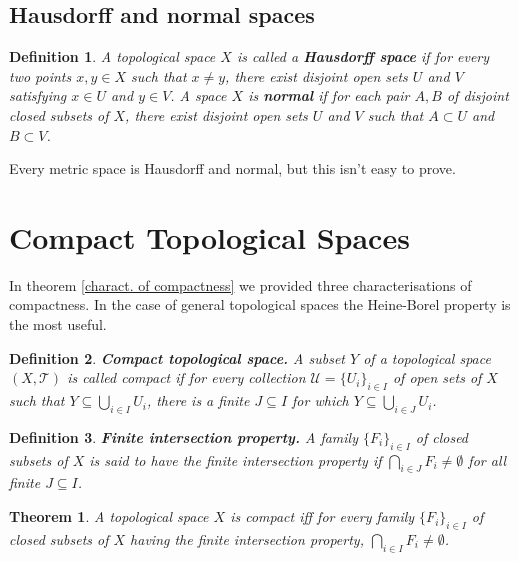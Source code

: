\documentclass[two column]{article}
\newtheorem{theorem}{Theorem}[subsection]
\newtheorem{definition}{Definition}[subsection]
\begin{document}
\subsection{Hausdorff and normal spaces}

\begin{definition}
A topological space $X$ is called a {\bf Hausdorff space} if for every two points $x,y \in X$ such that $x \neq y$, there exist disjoint open sets $U$ and $V$ satisfying $x \in U$ and $y \in V$. A space $X$ is {\bf normal} if for each pair $A,B$ of disjoint closed subsets of $X$, there exist disjoint open sets $U$ and $V$ such that $A \subset U$ and $B \subset V$. \\
\end{definition}

Every metric space is Hausdorff and normal, but this isn't easy to prove. 

\section{Compact Topological Spaces}

In theorem \ref{charact. of compactness} we provided three characterisations of compactness. In the case of general topological spaces the Heine-Borel property is the most useful. \\

\begin{definition}
{\bf Compact topological space.} A subset $Y$ of a topological space $(X, \mathcal{T})$ is called compact if for every collection $\mathcal{U} = \{ U_{i} \}_{i \in I}$ of open sets of $X$ such that $Y \subseteq \bigcup_{i \in I} U_{i}$, there is a finite $J \subseteq I$ for which $Y \subseteq \bigcup_{i \in J} U_{i}$. \\   
\end{definition}

\begin{definition}
{\bf Finite intersection property.} A family $\{F_{i}\}_{i \in I}$ of closed subsets of $X$ is said to have the finite intersection property if $\bigcap_{i \in J} F_{i} \neq \emptyset$ for all finite $J \subseteq I$. \\
\end{definition}

\begin{theorem}
A topological space $X$ is compact iff for every family $\{F_{i}\}_{i \in I}$ of closed subsets of $X$ having the finite intersection property, $\bigcap_{i \in I} F_{i} \neq \emptyset$.
\end{theorem}
\end{document}
